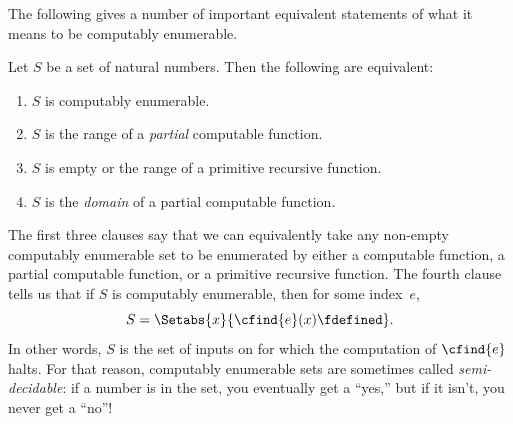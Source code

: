 \documentclass[../../../include/open-logic-section]{subfiles}
\begin{document}



The following gives a number of important equivalent statements of
what it means to be computably enumerable.

\begin{thm}
Let $S$ be a set of natural numbers. Then the following are
equivalent:
\begin{enumerate}
\item{} $S$ is computably enumerable.
\item{} $S$ is the range of a \emph{partial} computable function.
\item{} $S$ is empty or the range of a primitive recursive function.
\item{} $S$ is the \emph{domain} of a partial computable function.
\end{enumerate}
\end{thm}

\begin{explain}
The first three clauses say that we can equivalently take any non-empty
computably enumerable set to be enumerated by either a computable
function, a partial computable function, or a primitive recursive
function. The fourth clause tells us that if $S$ is computably
enumerable, then for some index~$e$,
\[
S = \Setabs{x}{\cfind{e}(x) \fdefined}.
\]
In other words, $S$ is the set of inputs on for which the computation
of $\cfind{e}$ halts. For that reason, computably enumerable sets are
sometimes called \emph{semi-decidable}: if a number is in the set, you
eventually get a ``yes,'' but if it isn't, you never get a ``no''!{}
\end{explain}
\end{document}
